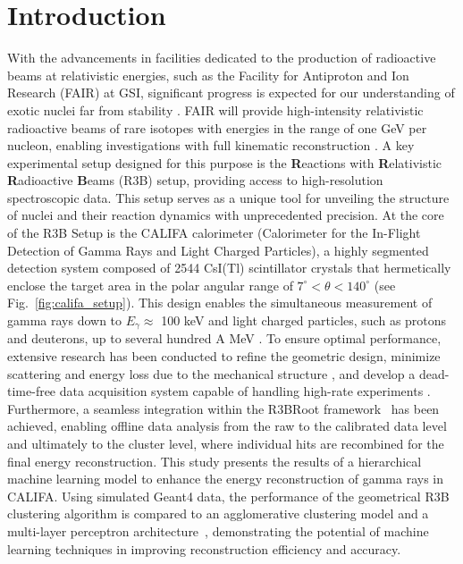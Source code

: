 \documentclass[review,sort&compress]{elsarticle}
\begin{document}
\section{Introduction}
\label{sec:intro}
With the advancements in facilities dedicated to the production of radioactive beams at relativistic energies, such as the Facility for Antiproton and Ion Research (FAIR) at GSI, significant progress is expected for our understanding of exotic nuclei far from stability \cite{kalantar2024experiments}. FAIR will provide high-intensity relativistic radioactive beams of rare isotopes with energies in the range of one GeV per nucleon, enabling investigations with full kinematic reconstruction \cite{leifels2025status}.
A key experimental setup designed for this purpose is the \textbf{R}eactions with \textbf{R}elativistic \textbf{R}adioactive \textbf{B}eams (R3B) setup, providing access to high-resolution spectroscopic data. This setup serves as a unique tool for unveiling the structure of nuclei and their reaction dynamics with unprecedented precision.\newline
At the core of the R3B Setup is the CALIFA calorimeter (Calorimeter for the In-Flight Detection of Gamma Rays and Light Charged Particles), a highly segmented detection system composed of 2544 CsI(Tl) scintillator crystals that hermetically enclose the target area in the polar angular range of $7^\circ < \theta < 140^\circ$ (see Fig.~\ref{fig:califa_setup}). This design enables the simultaneous measurement of gamma rays down to $E_{\gamma} \approx$ 100 keV and light charged particles, such as protons and deuterons, up to several hundred A MeV \cite{cortina2014califa}. To ensure optimal performance, extensive research has been conducted to refine the geometric design, minimize scattering and energy loss due to the mechanical structure \cite{alvarez2014performance}, and develop a dead-time-free data acquisition system capable of handling high-rate experiments \cite{ledigital}. Furthermore, a seamless integration within the R3BRoot framework~\cite{bertini2011r3broot} has been achieved, enabling offline data analysis from the raw to the calibrated data level and ultimately to the cluster level, where individual hits are recombined for the final energy reconstruction.\newline
This study presents the results of a hierarchical machine learning model to enhance the energy reconstruction of gamma rays in CALIFA. Using simulated Geant4 data, the performance of the geometrical R3B clustering algorithm is compared to an agglomerative clustering model \cite{Nielsen2016} and a multi-layer perceptron architecture~\cite{popescu2009multilayer}, demonstrating the potential of machine learning techniques in improving reconstruction efficiency and accuracy.\newline
\end{document}
